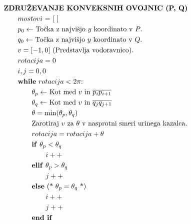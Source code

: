 \documentclass[fleqn]{article}
\begin{document}
\begin{align*}
    &\textbf{ZDRUŽEVANJE KONVEKSNIH OVOJNIC (P, Q)} \\
    &\text{\qquad $mostovi$ = [ ]} \\
    &\text{\qquad $p_0 \leftarrow$ Točka z najvišjo $y$ koordinato v $P$.} \\
    &\text{\qquad $q_0 \leftarrow$ Točka z najvišjo $y$ koordinato v $Q$.} \\
    &\text{\qquad $v = [-1, 0]$ (Predstavlja vodoravnico). } \\
    &\text{\qquad $rotacija = 0$} \\
    &\text{\qquad $i, j = 0, 0$} \\
    &\text{\qquad \textbf{while} $rotacija < 2 \pi$: } \\
    &\text{\qquad \qquad $\theta_p \leftarrow$ Kot med $v$ in $\overline{p_i p_{i+1}} $ } \\
    &\text{\qquad \qquad $\theta_q \leftarrow$ Kot med $v$ in $\overline{q_j q_{j+1}} $ } \\
    &\text{\qquad \qquad $\theta = \min (\theta_p, \theta_q)$} \\
    &\text{\qquad \qquad Zarotiraj $v$ za $\theta$ v nasprotni smeri urinega kazalca.} \\
    &\text{\qquad \qquad $rotacija = rotacija + \theta$} \\
    &\text{\qquad \qquad \textbf{if} $\theta_p < \theta_q$} \\
    &\text{\qquad \qquad \qquad $i++$} \\
    &\text{\qquad \qquad \textbf{elif} $\theta_p > \theta_q$} \\
    &\text{\qquad \qquad \qquad $j++$} \\
    &\text{\qquad \qquad \textbf{else} (* $\theta_p = \theta_q$ *)} \\
    &\text{\qquad \qquad \qquad $i++$} \\
    &\text{\qquad \qquad \qquad $j++$} \\
    &\text{\qquad \qquad \textbf{end if}} 
\end{align*}
\end{document}
